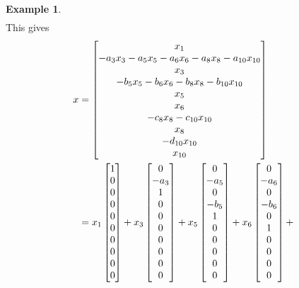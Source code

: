 \documentclass[reqno]{amsart}
\theoremstyle{definition}
\newtheorem{example}[theorem]{Example}
\begin{document}
\begin{example}
\[\begin{array}{ccccccccc}
 \end{array}\]
 This gives
 \begin{align*}
   x &=
     \bbm x_1 \\
          -a_3x_3-a_5x_5-a_6x_6-a_8x_8-a_{10}x_{10} \\
          x_3 \\
          -b_5x_5-b_6x_6-b_8x_8-b_{10}x_{10} \\
          x_5 \\
          x_6 \\
          -c_8x_8-c_{10}x_{10} \\
          x_8 \\
          -d_{10}x_{10} \\
          x_{10}
     \ebm
     \\
     &=
     x_1 \bbm 1 \\   0     \\  0  \\ 0       \\  0  \\  0  \\ 0       \\  0  \\ 0       \\  0  \ebm +
     x_3 \bbm 0 \\ -a_3    \\  1  \\ 0       \\  0  \\  0  \\ 0       \\  0  \\ 0       \\  0  \ebm +
     x_5 \bbm 0 \\ -a_5    \\  0  \\ -b_5    \\  1  \\  0  \\ 0       \\  0  \\ 0       \\  0  \ebm +
     x_6 \bbm 0 \\ -a_6    \\  0  \\ -b_6    \\  0  \\  1  \\ 0       \\  0  \\ 0       \\  0  \ebm +

\end{align*}
\end{example}
\end{document}
